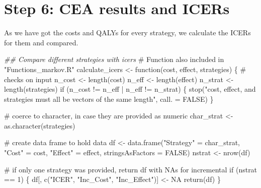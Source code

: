 \documentclass[
  letterpaper,
  DIV=11,
  numbers=noendperiod,
  oneside]{scrartcl}
\newenvironment{Shaded}{\begin{snugshade}}{\end{snugshade}}
\newcommand{\AttributeTok}[1]{\textcolor[rgb]{0.40,0.45,0.13}{#1}}
\newcommand{\CommentTok}[1]{\textcolor[rgb]{0.37,0.37,0.37}{#1}}
\newcommand{\ConstantTok}[1]{\textcolor[rgb]{0.56,0.35,0.01}{#1}}
\newcommand{\ControlFlowTok}[1]{\textcolor[rgb]{0.00,0.23,0.31}{#1}}
\newcommand{\DecValTok}[1]{\textcolor[rgb]{0.68,0.00,0.00}{#1}}
\newcommand{\DocumentationTok}[1]{\textcolor[rgb]{0.37,0.37,0.37}{\textit{#1}}}
\newcommand{\FunctionTok}[1]{\textcolor[rgb]{0.28,0.35,0.67}{#1}}
\newcommand{\NormalTok}[1]{\textcolor[rgb]{0.00,0.23,0.31}{#1}}
\newcommand{\OtherTok}[1]{\textcolor[rgb]{0.00,0.23,0.31}{#1}}
\newcommand{\SpecialCharTok}[1]{\textcolor[rgb]{0.37,0.37,0.37}{#1}}
\newcommand{\StringTok}[1]{\textcolor[rgb]{0.13,0.47,0.30}{#1}}
\begin{document}
\hypertarget{step-6-cea-results-and-icers}{%
\section{Step 6: CEA results and
ICERs}\label{step-6-cea-results-and-icers}}

As we have got the costs and QALYs for every strategy, we calculate the
ICERs for them and compared.

\begin{Shaded}
\begin{Highlighting}[]
\DocumentationTok{\#\# Compare different strategies with icers}
\CommentTok{\# Function also included in "Functions\_markov.R"}
\NormalTok{calculate\_icers }\OtherTok{\textless{}{-}} \ControlFlowTok{function}\NormalTok{(cost, effect, strategies) \{}
  \CommentTok{\# checks on input}
\NormalTok{  n\_cost }\OtherTok{\textless{}{-}} \FunctionTok{length}\NormalTok{(cost)}
\NormalTok{  n\_eff }\OtherTok{\textless{}{-}} \FunctionTok{length}\NormalTok{(effect)}
\NormalTok{  n\_strat }\OtherTok{\textless{}{-}} \FunctionTok{length}\NormalTok{(strategies)}
  \ControlFlowTok{if}\NormalTok{ (n\_cost }\SpecialCharTok{!=}\NormalTok{ n\_eff }\SpecialCharTok{|}\NormalTok{ n\_eff }\SpecialCharTok{!=}\NormalTok{ n\_strat) \{}
    \FunctionTok{stop}\NormalTok{(}\StringTok{"cost, effect, and strategies must all be vectors of the same length"}\NormalTok{, }\AttributeTok{call. =} \ConstantTok{FALSE}\NormalTok{)}
\NormalTok{  \}}

  \CommentTok{\# coerce to character, in case they are provided as numeric}
\NormalTok{  char\_strat }\OtherTok{\textless{}{-}} \FunctionTok{as.character}\NormalTok{(strategies)}

  \CommentTok{\# create data frame to hold data}
\NormalTok{  df }\OtherTok{\textless{}{-}} \FunctionTok{data.frame}\NormalTok{(}\StringTok{"Strategy"} \OtherTok{=}\NormalTok{ char\_strat,}
                   \StringTok{"Cost"} \OtherTok{=}\NormalTok{ cost,}
                   \StringTok{"Effect"} \OtherTok{=}\NormalTok{ effect,}
                   \AttributeTok{stringsAsFactors =} \ConstantTok{FALSE}\NormalTok{)}
\NormalTok{  nstrat }\OtherTok{\textless{}{-}} \FunctionTok{nrow}\NormalTok{(df)}

  \CommentTok{\# if only one strategy was provided, return df with NAs for incremental}
  \ControlFlowTok{if}\NormalTok{ (nstrat }\SpecialCharTok{==} \DecValTok{1}\NormalTok{) \{}
\NormalTok{    df[, }\FunctionTok{c}\NormalTok{(}\StringTok{"ICER"}\NormalTok{, }\StringTok{"Inc\_Cost"}\NormalTok{, }\StringTok{"Inc\_Effect"}\NormalTok{)] }\OtherTok{\textless{}{-}} \ConstantTok{NA}
    \FunctionTok{return}\NormalTok{(df)}
\NormalTok{  \}}


\end{Highlighting}
\end{Shaded}
\end{document}
